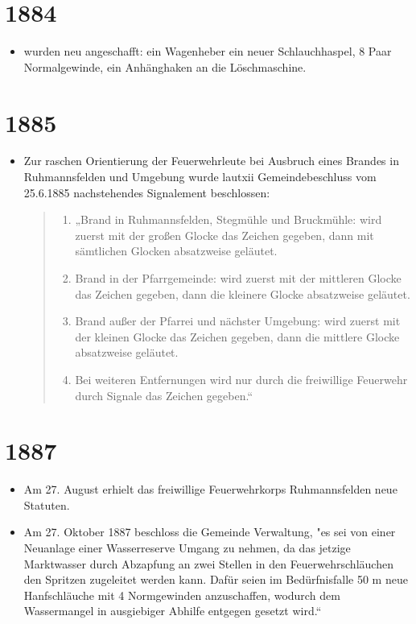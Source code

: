 \documentclass[12pt,a4paper]{book}
\begin{document}
\section*{1884}

\begin{itemize}
\item wurden neu angeschafft: ein Wagenheber ein neuer Schlauchhaspel, 8 Paar
Normalgewinde, ein Anhänghaken an die Löschmaschine.
\end{itemize}

\section*{1885}

\begin{itemize}
\item Zur raschen Orientierung der Feuerwehrleute bei Ausbruch eines Brandes in
Ruhmannsfelden und Umgebung wurde lautxii Gemeindebeschluss vom 25.6.1885
nachstehendes Signalement beschlossen:

\begin{quote}
\begin{enumerate}
\item „Brand in Ruhmannsfelden, Stegmühle und Bruckmühle: wird zuerst mit der
großen Glocke das Zeichen gegeben, dann mit sämtlichen Glocken absatzweise
geläutet.

\item Brand in der Pfarrgemeinde: wird zuerst mit der mittleren Glocke das
Zeichen gegeben, dann die kleinere Glocke absatzweise geläutet.

\item Brand außer der Pfarrei und nächster Umgebung: wird zuerst mit der kleinen
Glocke das Zeichen gegeben, dann die mittlere Glocke absatzweise geläutet.

\item Bei weiteren Entfernungen wird nur durch die freiwillige Feuerwehr durch
Signale das Zeichen gegeben.“
\end{enumerate}
\end{quote}
\end{itemize}

\section*{1887}

\begin{itemize}
\item Am 27. August erhielt das freiwillige Feuerwehrkorps Ruhmannsfelden neue
Statuten.

\item Am 27. Oktober 1887 beschloss die Gemeinde Verwaltung, "es sei von einer
Neuanlage einer Wasserreserve Umgang zu nehmen, da das jetzige Marktwasser durch
Abzapfung an zwei Stellen in den Feuerwehrschläuchen den Spritzen zugeleitet
werden kann. Dafür seien im Bedürfnisfalle 50 m neue Hanfschläuche mit 4
Normgewinden anzuschaffen, wodurch dem Wassermangel in ausgiebiger Abhilfe
entgegen gesetzt wird.“
\end{itemize}
\end{document}
